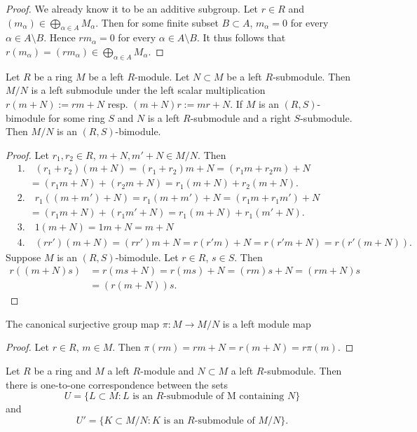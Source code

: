 \begin{proof}
    We already know it to be an additive subgroup.
    Let $r \in R$ and $(m_\alpha)\in \bigoplus_{\alpha\in A} M_\alpha$. Then for some finite subset $B\subset A$, $m_\alpha = 0$ for every $\alpha \in A\setminus B$. Hence $rm_\alpha = 0$ for every $\alpha \in A\setminus B$. It thus follows that $r(m_\alpha)=(rm_\alpha)\in \bigoplus_{\alpha \in A} M_\alpha$.
\end{proof}
\begin{lemma}\label{QuotientModule}
    Let $R$ be a ring $M$ be a left $R$-module. Let $N\subset M$ be a left $R$-submodule. Then $M/N$ is a left submodule under the left scalar multiplication $r(m+N) := rm+N$ resp. $(m+N)r := mr+N$. If $M$ is an $(R,S)$-bimodule for some ring $S$ and $N$ is a left $R$-submodule and a right $S$-submodule. Then $M/N$ is an $(R,S)$-bimodule.
\end{lemma}
\begin{proof}
    Let $r_1,r_2\in R$, $m+N,m'+N\in M/N$. Then 
    \begin{align*}
        &1. \quad (r_1+r_2)(m+N) = (r_1+r_2)m+N = (r_1m+r_2m)+N \\ & \quad \ =(r_1m+N)+(r_2m+N)= r_1(m+N) + r_2(m+N).\\
        &2. \quad  r_1((m+m')+N)=r_1(m+m')+N = (r_1m+r_1m')+N\\ &  \quad \ = (r_1m+N)+(r_1m'+N)= r_1(m+N)+r_1(m'+N).\\ 
        &3. \quad 1(m+N) = 1m+N = m +N\\
        &4. \quad (rr')(m+N)=(rr')m+N = r(r'm)+N= r(r'm+N)=r(r'(m+N)).
    \end{align*}
    Suppose $M$ is an $(R,S)$-bimodule. Let $r\in R$, $s\in S$. Then 
    \begin{align*} 
        r((m+N)s) &= r(ms+N)=r(ms)+N = (rm)s+N = (rm+N)s\\ 
        &=(r(m+N))s.
    \end{align*}
\end{proof}
\begin{corollary}
    The canonical surjective group map $\pi : M\rightarrow M/N$ is a left module map
\end{corollary}
\begin{proof}
    Let $r\in R$, $m\in M$. Then $\pi(rm)=rm+N=r(m+N)=r\pi(m).$
\end{proof}
\begin{lemma}\label{SubmodulesOfQuotientModule}
    Let $R$ be a ring and $M$ a left $R$-module and $N\subset M$ a left $R$-submodule. Then there is one-to-one correspondence between the sets 
    $$U=\{L\subset M : L \text{ is an } R\text{-submodule of M containing }N \}$$
    and 
    $$U' = \{ K \subset M/N : K \text{ is an } R\text{-submodule of } M/N\}.$$
\end{lemma}
